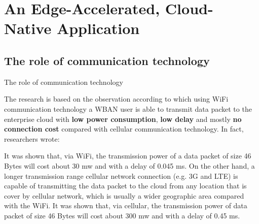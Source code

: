 \documentclass[10pt]{beamer}
\begin{document}
\section{An Edge-Accelerated, Cloud-Native Application}
\subsection{The role of communication technology}
\begin{frame}{The role of communication technology} 

The research is based on the observation according to which using WiFi communication technology a WBAN user is able to transmit data packet to the enterprise cloud with \textbf{low power consumption}, \textbf{low delay} and mostly \textbf{no connection cost} compared with cellular communication technology. In fact, researchers wrote:

\vspace{0.3cm}

\begin{quoting}[font=itshape, begintext={``}, endtext={''\cite[par.~3.1]{MSAReport}}]
It was shown that, via WiFi, the transmission power of a data packet of size 46 Bytes will cost about 30 mw and with a delay of 0.045 ms. On the other hand, a longer transmission range cellular network connection (e.g. 3G and LTE) is capable of transmitting the data packet to the cloud from any location that is cover by cellular network, which is usually a wider geographic area compared with the WiFi. It was shown that, via cellular, the transmission power of data packet of size 46 Bytes will cost about 300 mw and with a delay of 0.45 ms.
\end{quoting}

\vspace{0.3cm}

\end{frame} 
\end{document}

